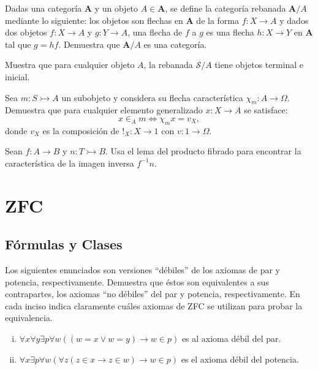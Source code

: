 \documentclass[10pt]{article}
\newcommand{\topos}[1]{\mathscr{#1}}
\newcommand{\cat}[1]{\mathbf{#1}}
\begin{document}
    \begin{exercise}
        Dadas una categoría \(\cat{A}\) y un objeto \(A\in\cat{A}\), se define
        la categoría rebanada  \(\cat{A}/A\) mediante lo siguiente: los objetos
        son flechas en \(\cat{A}\) de la forma \(f\colon X\to A\) y dados
        dos objetos \(f\colon X\to A\) y \(g\colon Y\to A\), una flecha de
        \(f\) a \(g\) es una flecha \(h\colon X\to Y\) en \(\cat{A}\) tal que
        \(g = hf\). Demuestra que \(\cat{A}/A\) es una categoría.
    \end{exercise}

    \begin{exercise}
        Muestra que para cualquier objeto \(A\), la rebanada \(\topos{S}/A\)
        tiene objetos terminal e inicial.
    \end{exercise}

    \begin{exercise}
        Sea \(m\colon S\rightarrowtail A\) un subobjeto y considera su flecha
        característica \(\chi_m\colon A\to \Omega\). Demuestra que para
        cualquier elemento generalizado \(x\colon X\to A\) se satisface:
        \begin{equation*}
            x\in_A m \iff \chi_m x = v_X,
        \end{equation*}
        donde \(v_X\) es la composición de \(!_X\colon X\to 1\) con 
        \(v\colon 1\to \Omega\).
    \end{exercise}

    \begin{exercise}
        Sean \(f\colon A\to B\) y \(n\colon T\rightarrowtail B\). Usa el lema
        del producto fibrado para encontrar la característica de la imagen
        inversa \(f^{-1}n\).
    \end{exercise}


    \newpage

    \section*{ZFC}
    \subsection*{Fórmulas y Clases}

    \begin{exercise}
        Los siguientes enunciados son versiones ``débiles'' de los axiomas de par y potencia, respectivamente. Demuestra que éstos son equivalentes a sus contrapartes, los axiomas ``no débiles'' del par y potencia, respectivamente. En cada inciso indica claramente cuáles axiomas de ZFC se utilizan para probar la equivalencia.
        \begin{enumerate}[i)]
            \item \(\forall x \forall y \exists p \forall w ( (w=x \lor w=y) \to w \in p ) \) es al axioma débil del par.
            \item \(\forall x \exists p \forall w ( \forall z ( z \in x \to z \in w) \rightarrow w \in p )\) es el axioma débil del potencia.
        \end{enumerate}
    \end{exercise}
\end{document}
